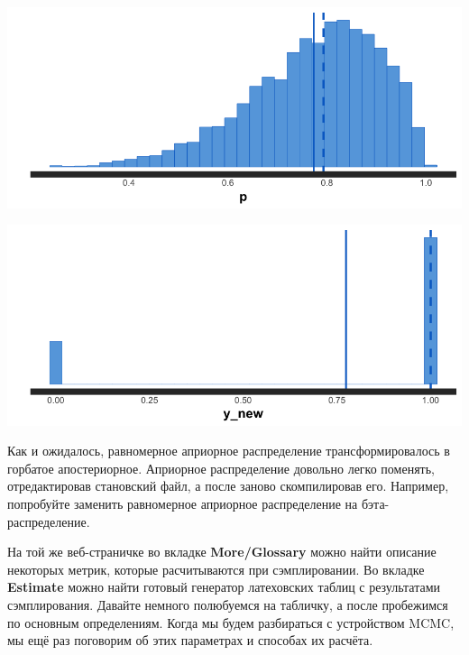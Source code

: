 \documentclass[12pt, a4paper, oneside]{extreport}
\theoremstyle{plain}              %
\theoremstyle{definition}         %
\begin{document}
	\begin{minipage}[H]{0.47\linewidth}
		\begin{center}
			\includegraphics[scale=0.22]{p_coin.png}
		\end{center}
	\end{minipage}
\hfill
	\begin{minipage}[H]{0.47\linewidth}
		\begin{center}
			\includegraphics[scale=0.22]{ynew_coin.png}
		\end{center}
	\end{minipage}

 \vspace{0.5cm}
 
 Как и ожидалось, равномерное априорное распределение трансформировалось в горбатое апостериорное.  Априорное распределение довольно легко поменять, отредактировав становский файл, а после заново скомпилировав его. Например, попробуйте заменить равномерное априорное распределение на бэта-распределение. 
 
 На той же веб-страничке во вкладке \textbf{More/Glossary} можно найти описание некоторых метрик, которые расчитываются при сэмплировании. Во вкладке \textbf{Estimate} можно найти готовый генератор латеховских таблиц с результатами сэмплирования. Давайте немного полюбуемся на табличку, а после пробежимся по основным определениям.  Когда мы будем разбираться с устройством MCMC, мы ещё раз поговорим об этих параметрах и способах их расчёта.  
  
\end{document}
